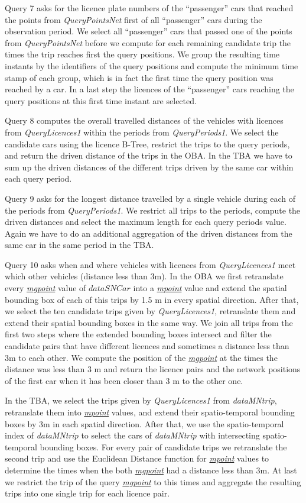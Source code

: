 \documentclass[a4paper]{article}
\newcommand{\dt}[1]{\textsl{\underline{#1}}}
\begin{document}
Query 7 asks for the licence plate numbers of the ``passenger'' cars that
reached the points from \textit{QueryPointsNet} first of all ``passenger'' cars
during the observation period. We select all ``passenger'' cars that passed one
of the points from \textit{QueryPointsNet} before we compute for each remaining
candidate trip the times the trip reaches first the query positions. We group 
the resulting time instants by the identifiers of the query positions and compute 
the minimum time stamp of each group, which is in fact the first time the query 
position was reached by a car. In a last step the licences of the ``passenger'' 
cars reaching the query positions at this first time instant are selected.

Query 8 computes the overall travelled distances of the vehicles with licences from
\textit{QueryLicences1} within the periods from \textit{QueryPeriods1}. We select 
the candidate cars using the licence B-Tree, restrict the trips to the query 
periods, and return the driven distance of the trips in the OBA. In the TBA we 
have to sum up the driven distances of the different trips driven by the same 
car within each query period.

Query 9 asks for the longest distance travelled by a single vehicle during each
of the periods from \textit{QueryPeriods1}. We restrict all trips to the periods,
compute the driven distances and select the maximum length for each query periods value.
Again we have to do an additional aggregation of the driven distances from the
same car in the same period in the TBA.

Query 10 asks when and where vehicles with licences from \textit{QueryLicences1} 
meet which other vehicles (distance less than 3m). In the OBA we first retranslate 
every \dt{mgpoint} value of $dataSNCar$ into a \dt{mpoint} value and extend the
spatial bounding box of each of this trips by 1.5 m in every spatial direction. 
After that, we select the ten candidate trips given by \textit{QueryLicences1}, 
retranslate them and extend their spatial bounding boxes in the same way. We join all trips from the
first two steps where the extended bounding boxes intersect and filter the
candidate pairs that have different licences and sometimes a distance less than
3m to each other. We compute the position of the \dt{mgpoint} at the
times the distance was less than 3 m and return the licence pairs and the
network positions of the first car when it has been closer than 3 m to the other
one.

In the TBA, we select the trips given by \textit{QueryLicences1} from
\textit{dataMNtrip}, retranslate them into \dt{mpoint} values, and extend their
spatio-temporal bounding boxes by 3m in each spatial direction. After that, we 
use the spatio-temporal index of \textit{dataMNtrip} to select the cars of 
\textit{dataMNtrip} with intersecting spatio-temporal bounding boxes. For every 
pair of candidate trips we retranslate the second trip and use the Euclidean 
Distance function for \dt{mpoint} values to determine the times when the both 
\dt{mgpoint} had a distance less than 3m.
At last we restrict the trip of the query \dt{mgpoint} to this times and
aggregate the resulting trips into one single trip for each licence pair.
\end{document}
